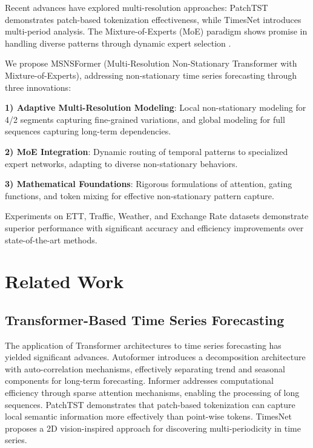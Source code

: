 \documentclass{article}
\begin{document}
Recent advances have explored multi-resolution approaches: PatchTST \cite{patchtst} demonstrates patch-based tokenization effectiveness, while TimesNet \cite{timesnet} introduces multi-period analysis. The Mixture-of-Experts (MoE) paradigm shows promise in handling diverse patterns through dynamic expert selection \cite{switchtransformer}.

We propose MSNSFormer (Multi-Resolution Non-Stationary Transformer with Mixture-of-Experts), addressing non-stationary time series forecasting through three innovations:

\textbf{1) Adaptive Multi-Resolution Modeling}: Local non-stationary modeling for 4/2 segments capturing fine-grained variations, and global modeling for full sequences capturing long-term dependencies.

\textbf{2) MoE Integration}: Dynamic routing of temporal patterns to specialized expert networks, adapting to diverse non-stationary behaviors.

\textbf{3) Mathematical Foundations}: Rigorous formulations of attention, gating functions, and token mixing for effective non-stationary pattern capture.

Experiments on ETT, Traffic, Weather, and Exchange Rate datasets demonstrate superior performance with significant accuracy and efficiency improvements over state-of-the-art methods.

\section{Related Work}
\label{sec:related}

\subsection{Transformer-Based Time Series Forecasting}
The application of Transformer architectures to time series forecasting has yielded significant advances. Autoformer \cite{autoformer} introduces a decomposition architecture with auto-correlation mechanisms, effectively separating trend and seasonal components for long-term forecasting. Informer \cite{informer} addresses computational efficiency through sparse attention mechanisms, enabling the processing of long sequences. PatchTST \cite{patchtst} demonstrates that patch-based tokenization can capture local semantic information more effectively than point-wise tokens. TimesNet \cite{timesnet} proposes a 2D vision-inspired approach for discovering multi-periodicity in time series.
\end{document}
